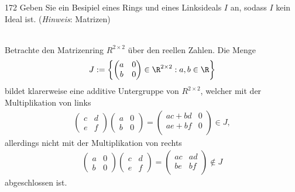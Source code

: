 \begin{algebraUE}{172}
Geben Sie ein Besipiel eines Rings und eines Linksideals $I$ an, sodass $I$ kein Ideal ist.
(\textit{Hinweis}: Matrizen)
\end{algebraUE}
\begin{solution}
\leavevmode \\
Betrachte den Matrizenring $R^{2 \times 2}$ über den reellen Zahlen. Die Menge
\begin{align*}
  J := \left\{\begin{pmatrix}
    a & 0 \\ b & 0
  \end{pmatrix} \in \R^{2 \times 2}: a,b \in \R\right\}
\end{align*}
bildet klarerweise eine additive Untergruppe von $R^{2 \times 2}$,
welcher mit der Multiplikation von links
\begin{align*}
  \begin{pmatrix}
    c & d \\
    e & f
  \end{pmatrix}
  \begin{pmatrix}
    a & 0 \\ b & 0
  \end{pmatrix}
  = \begin{pmatrix}
    ac + bd & 0 \\
    ae + bf & 0 \\
  \end{pmatrix} \in J,
\end{align*}
allerdings nicht mit der Multiplikation von rechts
\begin{align*}
\begin{pmatrix}
  a & 0 \\ b & 0
\end{pmatrix}
\begin{pmatrix}
  c & d \\
  e & f
\end{pmatrix}
= \begin{pmatrix}
  ac & ad \\
  be & bf \\
\end{pmatrix} \notin J
\end{align*}
abgeschlossen ist.
\end{solution}

